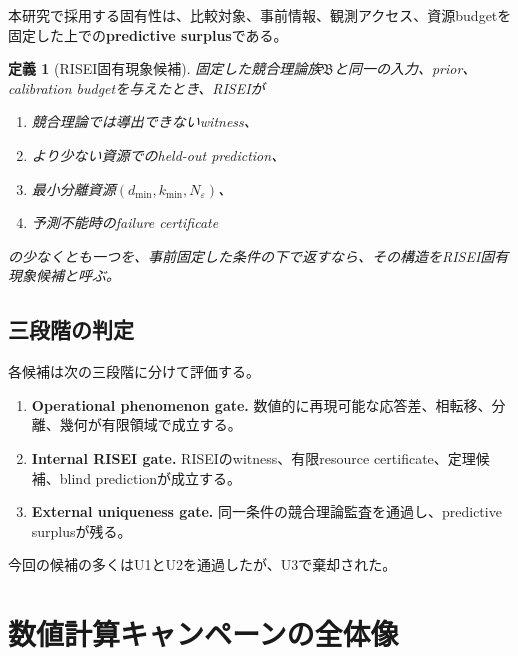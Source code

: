 \documentclass[11pt,a4paper,uplatex,dvipdfmx]{bxjsarticle}
\newtheorem{definition}{定義}[section]
\theoremstyle{remark}
\newcommand{\eps}{\varepsilon}
\begin{document}
本研究で採用する固有性は、比較対象、事前情報、観測アクセス、資源budgetを固定した上での\textbf{predictive surplus}である。

\begin{definition}[RISEI固有現象候補]
固定した競合理論族$\mathfrak B$と同一の入力、prior、calibration budgetを与えたとき、RISEIが
\begin{enumerate}
  \item 競合理論では導出できないwitness、
  \item より少ない資源でのheld-out prediction、
  \item 最小分離資源$\left(d_{\min},k_{\min},N_{\eps}\right)$、
  \item 予測不能時のfailure certificate
\end{enumerate}
の少なくとも一つを、事前固定した条件の下で返すなら、その構造をRISEI固有現象候補と呼ぶ。
\end{definition}

\subsection{三段階の判定}

各候補は次の三段階に分けて評価する。

\begin{enumerate}[label=\textbf{U\arabic*.}]
  \item \textbf{Operational phenomenon gate.} 数値的に再現可能な応答差、相転移、分離、幾何が有限領域で成立する。
  \item \textbf{Internal RISEI gate.} RISEIのwitness、有限resource certificate、定理候補、blind predictionが成立する。
  \item \textbf{External uniqueness gate.} 同一条件の競合理論監査を通過し、predictive surplusが残る。
\end{enumerate}

今回の候補の多くはU1とU2を通過したが、U3で棄却された。

\section{数値計算キャンペーンの全体像}
\end{document}
